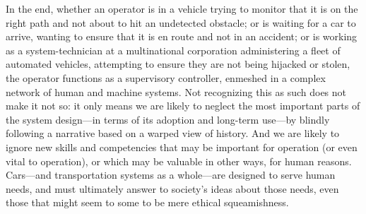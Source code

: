 In the end, whether an operator is in a vehicle trying to monitor that it
is on the right path and not about to hit an undetected
obstacle; or is waiting
for a car to arrive, wanting to ensure that it is en route
and not in an accident; or is working as a system-technician at a
multinational corporation administering a fleet of automated vehicles,
attempting to ensure they are not being 
hijacked or stolen, the operator functions as a supervisory
controller, enmeshed in a complex network of human and machine
systems. Not recognizing this as such does not make it not so:  it 
only means we are 
likely to neglect the most important parts of the system design---in
terms of its adoption and long-term use---by blindly following a
narrative based on a warped view of history. And we are likely to
ignore new skills and competencies that may be important for
operation (or even vital to operation), or which may be valuable in other ways, for
human reasons. Cars---and transportation systems as a whole---are
designed to serve human needs, and must ultimately answer to society's
ideas about those
needs, even those that might seem to some to be mere ethical squeamishness.






